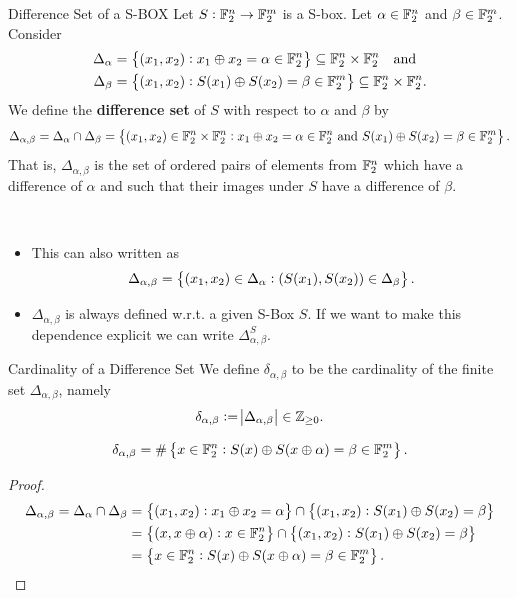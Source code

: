 \documentclass[11pt,openany]{article}
\begin{document}
\vspace{12pt}
\begin{defbox}{Difference Set of a S-BOX}
Let $S:\mathbb{F}_2^n\to\mathbb{F}_2^m$ is a S-box. Let $\alpha\in\mathbb{F}_2^n$ and $\beta\in\mathbb{F}_2^m$. Consider \begin{align*}
	\Delta_\alpha&=\set{(x_1,x_2):x_1\oplus x_2=\alpha\in\mathbb{F}_2^n}\subseteq\mathbb{F}_2^n\times\mathbb{F}_2^n\quad \text{and}\\
	\Delta_\beta&=\set{(x_1,x_2):S(x_1)\oplus S(x_2)=\beta\in\mathbb{F}_2^m}\subseteq\mathbb{F}_2^n\times\mathbb{F}_2^n.
\end{align*}
We define the \textbf{difference set} of $S$ with respect to $\alpha$ and $\beta$ by \[
\Delta_{\alpha,\beta}=\Delta_\alpha\cap\Delta_\beta=\set{(x_1,x_2)\in\mathbb{F}_2^n\times\mathbb{F}_2^n:x_1\oplus x_2=\alpha\in\mathbb{F}_2^n\ \text{and}\ S(x_1)\oplus S(x_2)=\beta\in\mathbb{F}_2^m}.
\] That is, $\Delta_{\alpha,\beta}$ is the set of ordered pairs of elements from $\mathbb{F}_2^n$ which have a difference of $\alpha$ and such that their images under $S$ have a difference of $\beta$.
\end{defbox}
\begin{remark}
\ \begin{itemize}
	\item This can also written as \[
	\Delta_{\alpha,\beta}=\set{(x_1,x_2)\in\Delta_\alpha:(S(x_1),S(x_2))\in\Delta_\beta}.
	\]
	\item $\Delta_{\alpha,\beta}$ is always defined w.r.t. a given S-Box $S$. If we want to make this dependence explicit we can write $\Delta_{\alpha,\beta}^S$.
\end{itemize}
\end{remark}
\vspace{12pt}
\begin{defbox}{Cardinality of a Difference Set}
	We define $\delta_{\alpha,\beta}$ to be the cardinality of the finite set $\Delta_{\alpha,\beta}$, namely \[
	\delta_{\alpha,\beta}:=\abs{\Delta_{\alpha,\beta}}\in\mathbb{Z}_{\geq 0}.
	\]
\end{defbox}

\vspace{12pt}
\begin{probox}{}
	\begin{proposition}
		\[
		\delta_{\alpha,\beta}=\#\set{x\in\mathbb{F}_2^n:S(x)\oplus S(x\oplus\alpha)=\beta\in\mathbb{F}_2^m}.
		\]
	\end{proposition}
\end{probox}
\begin{proof}
	\begin{align*}
		\Delta_{\alpha ,\beta }=\Delta_{\alpha}\cap\Delta_{\beta}
		&=\set{(x_1,x_2):x_1\oplus x_2=\alpha}\cap \set{(x_1,x_2):S(x_1)\oplus S(x_2)=\beta}\\
		&=\set{(x,x\oplus\alpha):x\in\mathbb{F}_2^n}\cap \set{(x_1,x_2):S(x_1)\oplus S(x_2)=\beta} \\
		&=\set{x\in\mathbb{F}_2^n:S(x)\oplus S(x\oplus \alpha)=\beta\in\mathbb{F}_2^m}.
	\end{align*}
\end{proof}
\end{document}

